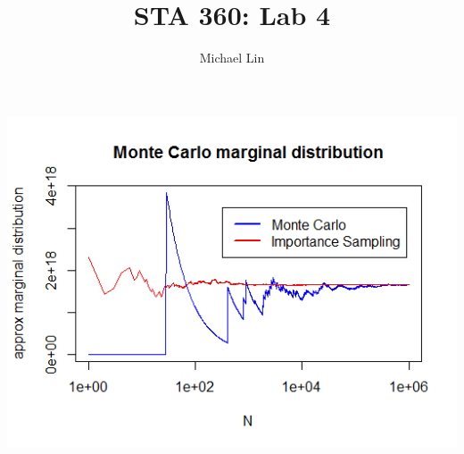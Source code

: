 \documentclass{article}
\title{STA 360: Lab 4}
\author{Michael Lin}
\begin{document}
\maketitle
\centering
\includegraphics[scale=0.7]{graph.png}


\end{document}

